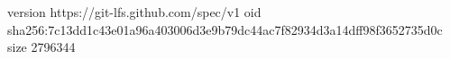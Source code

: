 version https://git-lfs.github.com/spec/v1
oid sha256:7c13dd1c43e01a96a403006d3e9b79dc44ac7f82934d3a14dff98f3652735d0c
size 2796344
